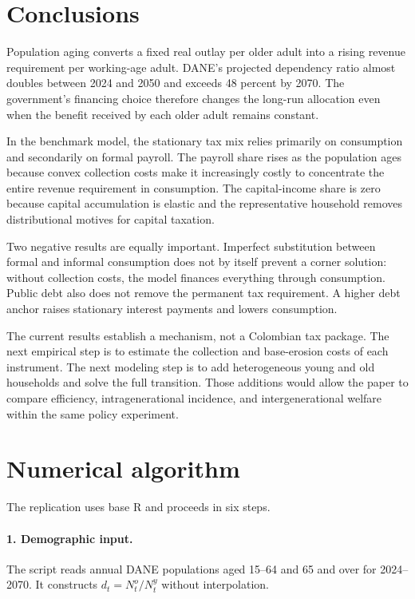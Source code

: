 \documentclass[12pt]{article}
\begin{document}
\section{Conclusions}

Population aging converts a fixed real outlay per older adult into a rising
revenue requirement per working-age adult. DANE's projected dependency ratio
almost doubles between 2024 and 2050 and exceeds 48 percent by 2070. The
government's financing choice therefore changes the long-run allocation even
when the benefit received by each older adult remains constant.

In the benchmark model, the stationary tax mix relies primarily on
consumption and secondarily on formal payroll. The payroll share rises as the
population ages because convex collection costs make it increasingly costly
to concentrate the entire revenue requirement in consumption. The
capital-income share is zero because capital accumulation is elastic and the
representative household removes distributional motives for capital taxation.

Two negative results are equally important. Imperfect substitution between
formal and informal consumption does not by itself prevent a corner solution:
without collection costs, the model finances everything through consumption.
Public debt also does not remove the permanent tax requirement. A higher debt
anchor raises stationary interest payments and lowers consumption.

The current results establish a mechanism, not a Colombian tax package. The
next empirical step is to estimate the collection and base-erosion costs of
each instrument. The next modeling step is to add heterogeneous young and old
households and solve the full transition. Those additions would allow the
paper to compare efficiency, intragenerational incidence, and
intergenerational welfare within the same policy experiment.

\appendix
\section{Numerical algorithm}

The replication uses base R and proceeds in six steps.

\paragraph{1. Demographic input.}
The script reads annual DANE populations aged 15--64 and 65 and over for
2024--2070. It constructs $d_t=N_t^o/N_t^y$ without interpolation.
\end{document}

